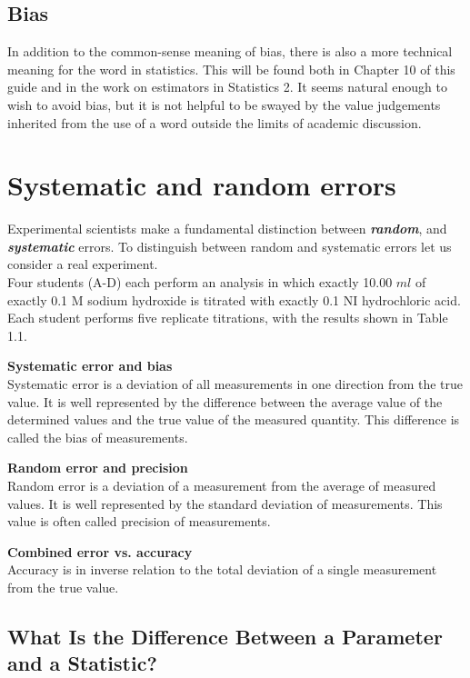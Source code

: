 ﻿\documentclass[]{report}
\begin{document}
\subsection{Bias}
In addition to the common-sense meaning of bias, there is also a more technical meaning for the
word in statistics. This will be found both in Chapter 10 of this guide and in the work on estimators
in Statistics 2. It seems natural enough to wish to avoid bias, but it is not helpful to be swayed by
the value judgements inherited from the use of a word outside the limits of academic discussion.



\section{Systematic and random errors}
Experimental scientists make a fundamental distinction between \textbf{\emph{random}}, and
\textbf{\emph{systematic}} errors. To distinguish between random and systematic errors let
us consider a real experiment.\\

\noindent Four students (A-D) each perform an analysis in which exactly 10.00 $ml$
of exactly 0.1 M sodium hydroxide is titrated with exactly 0.1 NI
hydrochloric acid.
Each student performs five replicate titrations, with the results shown in
Table 1.1.



\textbf{Systematic error and bias}\\
Systematic error is a deviation of all measurements in one direction from the true value. It is well represented by the difference between the average value of the determined values and the true value
of the measured quantity. This difference is called the bias of measurements.

\textbf{Random error and precision}\\
Random error is a deviation of a measurement from the average of measured values.
It is well represented by the standard deviation of measurements.
This value is often called precision of measurements.

\textbf{Combined error vs. accuracy}\\
Accuracy is in inverse relation to the total deviation of a single measurement from the true value.









\subsection*{What Is the Difference Between a Parameter and a Statistic?}
\end{document}
